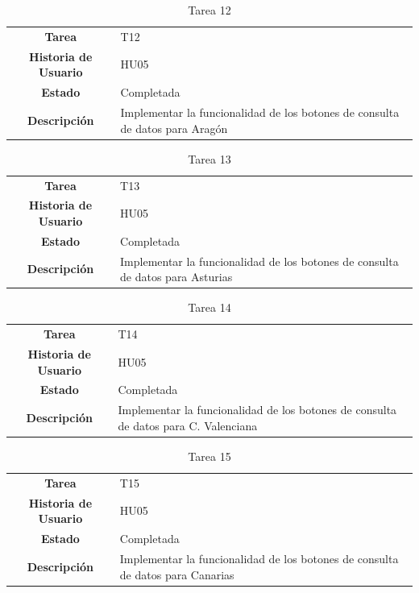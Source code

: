 \begin{table}[H]
	\begin{center}
		\begin{tabular}{| c | p{9cm} |}
			\hline
			
			\textbf{Tarea} & T12 \\
			\textbf{Historia de Usuario} & HU05 \\
			\textbf{Estado} & Completada \\
			\textbf{Descripción} & Implementar la funcionalidad de los botones de consulta de datos para Aragón \\ \hline
		\end{tabular}
		\caption{Tarea 12}
	\end{center}
\end{table}

\begin{table}[H]
	\begin{center}
		\begin{tabular}{| c | p{9cm} |}
			\hline
			
			\textbf{Tarea} & T13 \\
			\textbf{Historia de Usuario} & HU05 \\
			\textbf{Estado} & Completada \\
			\textbf{Descripción} & Implementar la funcionalidad de los botones de consulta de datos para Asturias \\ \hline
		\end{tabular}
		\caption{Tarea 13}
	\end{center}
\end{table}

\begin{table}[H]
	\begin{center}
		\begin{tabular}{| c | p{9cm} |}
			\hline
			
			\textbf{Tarea} & T14 \\
			\textbf{Historia de Usuario} & HU05 \\
			\textbf{Estado} & Completada \\
			\textbf{Descripción} & Implementar la funcionalidad de los botones de consulta de datos para C. Valenciana \\ \hline
		\end{tabular}
		\caption{Tarea 14}
	\end{center}
\end{table}

\begin{table}[H]
	\begin{center}
		\begin{tabular}{| c | p{9cm} |}
			\hline
			
			\textbf{Tarea} & T15 \\
			\textbf{Historia de Usuario} & HU05 \\
			\textbf{Estado} & Completada \\
			\textbf{Descripción} & Implementar la funcionalidad de los botones de consulta de datos para Canarias \\ \hline
		\end{tabular}
		\caption{Tarea 15}
	\end{center}
\end{table}

